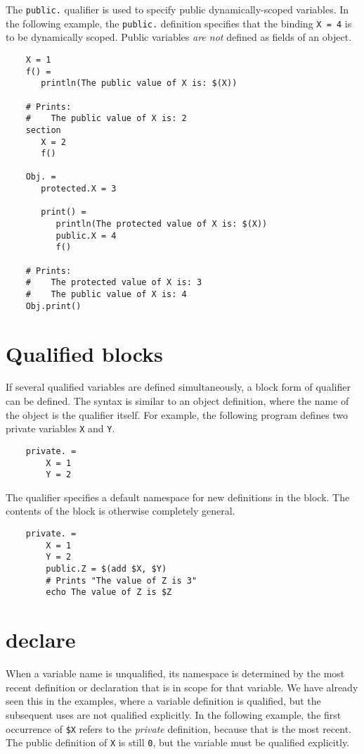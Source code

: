 The \verb+public.+ qualifier is used to specify public dynamically-scoped variables.  In the following
example, the \verb+public.+ definition specifies that the binding \verb+X = 4+ is to be dynamically
scoped.  Public variables \emph{are not} defined as fields of an object.

\begin{verbatim}
    X = 1
    f() =
       println(The public value of X is: $(X))

    # Prints:
    #    The public value of X is: 2
    section
       X = 2
       f()

    Obj. =
       protected.X = 3

       print() =
          println(The protected value of X is: $(X))
          public.X = 4
          f()

    # Prints:
    #    The protected value of X is: 3
    #    The public value of X is: 4
    Obj.print()
\end{verbatim}

\section{Qualified blocks}

If several qualified variables are defined simultaneously, a block form of qualifier can be defined.
The syntax is similar to an object definition, where the name of the object is the qualifier itself.
For example, the following program defines two private variables \verb+X+ and \verb+Y+.

\begin{verbatim}
    private. =
        X = 1
        Y = 2
\end{verbatim}
%
The qualifier specifies a default namespace for new definitions in the block.  The contents of the
block is otherwise completely general.

\begin{verbatim}
    private. =
        X = 1
        Y = 2
        public.Z = $(add $X, $Y)
        # Prints "The value of Z is 3"
        echo The value of Z is $Z
\end{verbatim}

\section{declare}
\label{section:declare}

When a variable name is unqualified, its namespace is determined by the most recent definition or
declaration that is in scope for that variable.  We have already seen this in the examples, where a
variable definition is qualified, but the subsequent uses are not qualified explicitly.  In the
following example, the first occurrence of \verb+$X+ refers to the \emph{private} definition,
because that is the most recent.  The public definition of \verb+X+ is still \verb+0+, but the
variable must be qualified explicitly.

